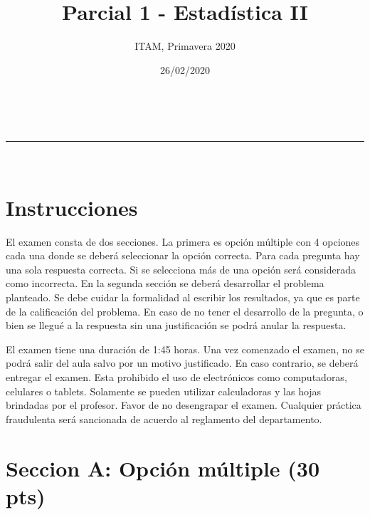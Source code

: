 \documentclass[addpoints]{exam}
\makeatletter
\newcommand{\linia}{\rule{\linewidth}{0.5pt}}
\theoremstyle{mytheor}
\renewcommand{\maketitle}{
    \begin{center}
    \vspace{2ex}
    {\huge \textsc{\@title}}
    \vspace{1ex}
    \\
    \linia\\
    \@author \hfill \@date
    \vspace{4ex}
    \end{center}
  }
\makeatother
\begin{document}
  
  \title{Parcial 1 - Estadística II}
  
  \author{ITAM, Primavera 2020}
  
  \date{26/02/2020}
  
  \maketitle
  
  \section*{Instrucciones}
  
  El examen consta de dos secciones. La primera es opción múltiple con 4 opciones cada una donde se deberá seleccionar la opción correcta. Para cada pregunta hay una sola respuesta correcta. Si se selecciona más de una opción será considerada como incorrecta. En la segunda sección se deberá desarrollar el problema planteado. Se debe cuidar la formalidad al escribir los resultados, ya que es parte de la calificación del problema. En caso de no tener el desarrollo de la pregunta, o bien se llegué a la respuesta sin una justificación se podrá anular la respuesta. 
  
  \vspace{10pt}
  
  
  El examen tiene una duración de 1:45 horas. Una vez comenzado el examen, no se podrá salir del aula salvo por un motivo justificado. En caso contrario, se deberá entregar el examen. Esta prohibido el uso de electrónicos como computadoras, celulares o tablets. Solamente se pueden utilizar calculadoras y las hojas brindadas por el profesor. Favor de no desengrapar el examen. Cualquier práctica fraudulenta será sancionada de acuerdo al reglamento del departamento. 
  
  \section*{Seccion A: Opción múltiple (30 pts)}
  
\end{document}
